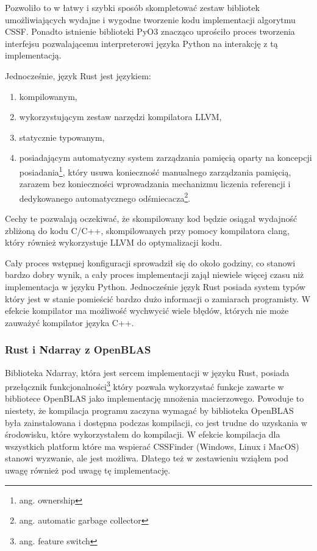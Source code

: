 \documentclass[11pt, a4paper]{article}
\begin{document}
\begin{sloppypar}
    Pozwoliło to w łatwy i szybki sposób skompletować zestaw bibliotek umożliwiających wydajne
    i wygodne tworzenie kodu implementacji algorytmu CSSF. Ponadto istnienie biblioteki
    PyO3 znacząco uprościło proces tworzenia interfejsu pozwalającemu interpreterowi
    języka Python na interakcję z tą implementacją.

    \newpage


    Jednocześnie, język Rust jest językiem:
    \begin{enumerate}
      \item kompilowanym,

      \item wykorzystującym zestaw narzędzi kompilatora LLVM,

      \item statycznie typowanym,

      \item posiadającym automatyczny system zarządzania pamięcią oparty na koncepcji posiadania\footnote{ang.
        ownership}, który usuwa konieczność manualnego zarządzania pamięcią, zarazem bez
        konieczności wprowadzania mechanizmu liczenia referencji i dedykowanego
        automatycznego odśmiecacza\footnote{ang. automatic garbage collector}.
    \end{enumerate}

    Cechy te pozwalają oczekiwać, że skompilowany kod będzie osiągał wydajność zbliżoną
    do kodu C/C++, skompilowanych przy pomocy kompilatora clang, który również
    wykorzystuje LLVM do optymalizacji kodu.

    Cały proces wstępnej konfiguracji sprowadził się do około godziny, co stanowi bardzo
    dobry wynik, a cały proces implementacji zajął niewiele więcej czasu niż
    implementacja w języku Python. Jednocześnie język Rust posiada system typów który jest
    w stanie pomieścić bardzo dużo informacji o zamiarach programisty. W efekcie
    kompilator ma możliwość wychwycić wiele błędów, których nie może zauważyć kompilator
    języka C++.

    \subsubsection{Rust i Ndarray z OpenBLAS}
    Biblioteka Ndarray, która jest sercem implementacji w języku Rust, posiada przełącznik
    funkcjonalności\footnote{ang. feature switch} który pozwala wykorzystać funkcje
    zawarte w bibliotece OpenBLAS \cite{OpenBLAS} jako implementację mnożenia
    macierzowego. Powoduje to niestety, że kompilacja programu zaczyna wymagać by
    biblioteka OpenBLAS była zainstalowana i dostępna podczas kompilacji, co jest trudne
    do uzyskania w środowisku, które wykorzystałem do kompilacji. W efekcie kompilacja dla
    wszystkich platform które ma wspierać CSSFinder (Windows, Linux i MacOS) stanowi
    wyzwanie, ale jest możliwa. Dlatego też w zestawieniu wziąłem pod uwagę również pod
    uwagę tę implementację.


\end{sloppypar}
\end{document}

